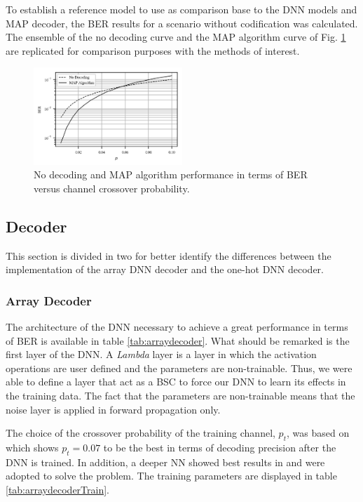 \documentclass[conference]{IEEEtran}
\begin{document}
To establish a reference model to use as comparison base to the DNN models and MAP decoder, the BER results for a scenario without codification was calculated. The ensemble of the no decoding curve and the MAP algorithm curve of Fig. \ref{fig:MAP} are replicated for comparison purposes with the methods of interest.

\begin{figure}[!ht]
  \centering
    \includegraphics[width=0.5\textwidth]{images/MAP-alone-curve}
    \caption{No decoding and MAP algorithm performance in terms of BER versus channel crossover probability.}\label{fig:MAP}
\end{figure}

\subsection{Decoder}

This section is divided in two for better identify the differences between the implementation of the array DNN decoder and the one-hot DNN decoder.

\subsubsection{Array Decoder}

The architecture of the DNN necessary to achieve a great performance in terms of BER is available in table \ref{tab:arraydecoder}. What should be remarked is the first layer of the DNN. A \textit{Lambda} layer is a layer in which the activation operations are user defined and the parameters are non-trainable. Thus, we were able to define a layer that act as a BSC to force our DNN to learn its effects in the training data. The fact that the parameters are non-trainable means that the noise layer is applied in forward propagation only.

The choice of the crossover probability of the training channel, $p_{t}$, was based on \cite{DBLP:conf/acssc/BenammarP18} which shows $p_{t}=0.07$ to be the best in terms of decoding precision after the DNN is trained. In addition, a deeper NN showed best results in \cite{ DBLP:journals/corr/OSheaH17} and were adopted to solve the problem. The training parameters are displayed in table \ref{tab:arraydecoderTrain}.
\end{document}
